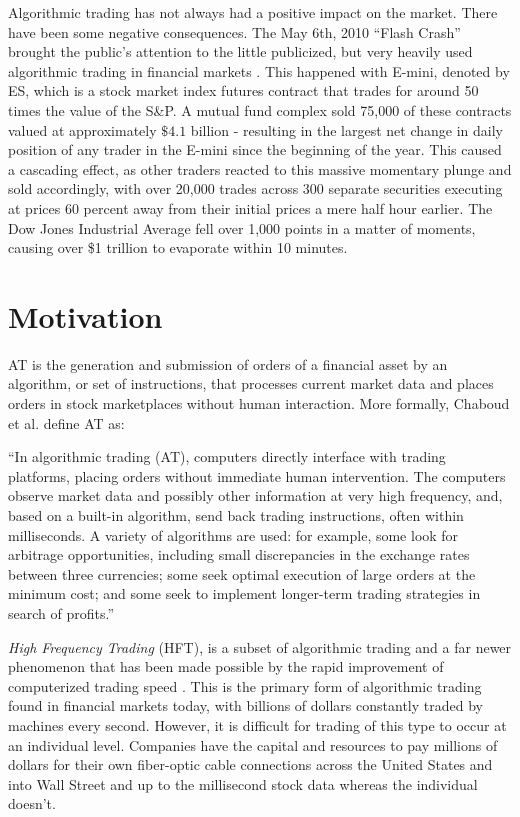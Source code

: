 \documentclass[../thesis.tex]{subfiles}
\begin{document}
Algorithmic trading has not always had a positive impact on the market. There have been some negative consequences. The May 6th, 2010 ``Flash Crash'' brought the public's attention to the little publicized, but very heavily used algorithmic trading in financial markets \cite{Kirilenko2017}. This happened with E-mini, denoted by ES, which is a stock market index futures contract that trades for around 50 times the value of the S\&P. A mutual fund complex sold 75,000 of these contracts valued at approximately $\$4.1$ billion - resulting in the largest net change in daily position of any trader in the E-mini since the beginning of the year. This caused a cascading effect, as other traders reacted to this massive momentary plunge and sold accordingly, with over 20,000 trades across 300 separate securities executing at prices 60 percent away from their initial prices a mere half hour earlier. The Dow Jones Industrial Average fell over 1,000 points in a matter of moments, causing over \$1 trillion to evaporate within 10 minutes. 


\section{Motivation}

AT is the generation and submission of orders of a financial asset by an algorithm, or set of instructions, that processes current market data and places orders in stock marketplaces without human interaction. More formally, Chaboud et al. \cite{Chaboud2009} define AT as: \begin{displayquote} ``In algorithmic trading (AT), computers directly interface with trading platforms, placing orders without immediate human intervention. The computers observe market data and possibly other information at very high frequency, and, based on a built-in algorithm, send back trading instructions, often within milliseconds. A variety of algorithms are used: for example, some look for arbitrage opportunities,
including small discrepancies in the exchange rates between three currencies; some
seek optimal execution of large orders at the minimum cost; and some seek to
implement longer-term trading strategies in search of profits.'' \end{displayquote}

\textit{High Frequency Trading} (HFT), is a subset of algorithmic trading and a far newer phenomenon that has been made possible by the rapid improvement of computerized trading speed \cite{Gomber2011}. This is the primary form of algorithmic trading found in financial markets today, with billions of dollars constantly traded by machines every second. However, it is difficult for trading of this type to occur at an individual level. Companies have the capital and resources to pay millions of dollars for their own fiber-optic cable connections across the United States and into Wall Street and up to the millisecond stock data whereas the individual doesn't. 
\end{document}
